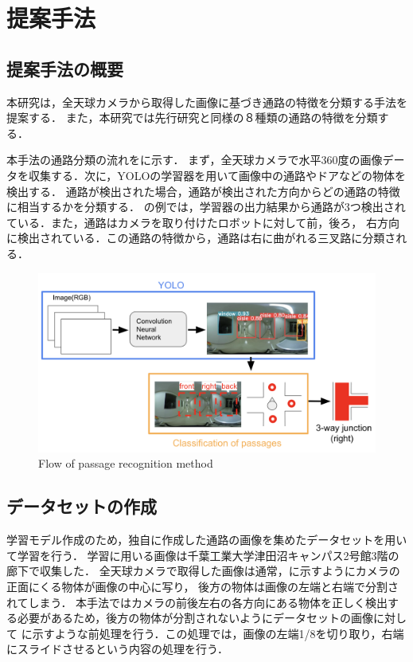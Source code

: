 \documentclass[../main]{subfiles}
\begin{document}
    \setcounter{secnumdepth}{2}
    \chapter{提案手法}
        \section{提案手法の概要}
        本研究は，全天球カメラから取得した画像に基づき通路の特徴を分類する手法を提案する．
        また，本研究では先行研究と同様の８種類の通路の特徴を分類する．

        
        本手法の通路分類の流れをに示す．
        まず，全天球カメラで水平360度の画像データを収集する．次に，YOLOの学習器を用いて画像中の通路やドアなどの物体を検出する．
        通路が検出された場合，通路が検出された方向からどの通路の特徴に相当するかを分類する．
        の例では，学習器の出力結果から通路が3つ検出されている．また，通路はカメラを取り付けたロボットに対して前，後ろ，
        右方向に検出されている．この通路の特徴から，通路は右に曲がれる三叉路に分類される．
        
        \begin{figure}[H]
            \centering
            \includegraphics[width=15cm]{../images/proposed_method.png}
            \caption{Flow of passage recognition method}
            \label{figure::proposed_method}
        \end{figure}

        \newpage

        \section{データセットの作成}
        学習モデル作成のため，独自に作成した通路の画像を集めたデータセットを用いて学習を行う．
        学習に用いる画像は千葉工業大学津田沼キャンパス2号館3階の廊下で収集した．
        全天球カメラで取得した画像は通常，に示すようにカメラの正面にくる物体が画像の中心に写り，
        後方の物体は画像の左端と右端で分割されてしまう．
        本手法ではカメラの前後左右の各方向にある物体を正しく検出する必要があるため，後方の物体が分割されないようにデータセットの画像に対して
        に示すような前処理を行う．この処理では，画像の左端1/8を切り取り，右端にスライドさせるという内容の処理を行う．
\end{document}
